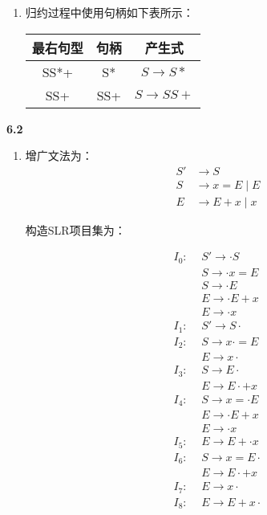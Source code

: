 \documentclass[UTF8]{report}
\newcommand{\tbf}[1]{\textbf{#1}}
\begin{document}
\begin{enumerate}[label=(\arabic*)]
\begin{table}[H]
    \end{table}
    \item 归约过程中使用句柄如下表所示：
    \begin{table}[H]
        \centering
        \begin{tabular}{|c|c|c|}
            \hline
            最右句型 & 句柄 & 产生式 \\
            \hline
            SS*+ & S* & $S \to S*$ \\
            SS+ & SS+ & $S \to SS+$ \\
            \hline
        \end{tabular}
    \end{table}
\end{enumerate}

\noindent
\tbf{6.2}

\begin{enumerate}[label=(\arabic*)]
    \item 增广文法为：
    \begin{align*}
        S' &\to S \\
        S &\to x = E \mid E \\
        E &\to E + x \mid x
    \end{align*}

    构造SLR项目集为：

    \begin{align*}
        I_0: \,\ &S' \to \cdot S \\
        &S \to \cdot x = E \\
        &S \to \cdot E \\
        &E \to \cdot E + x \\
        &E \to \cdot x \\
        I_1: \,\ &S' \to S \cdot \\
        I_2: \,\ &S \to x \cdot = E \\
        &E \to x \cdot \\
        I_3: \,\ &S \to E \cdot \\
        &E \to E \cdot + x \\
        I_4: \,\ &S \to x = \cdot E \\
        &E \to \cdot E + x \\
        &E \to \cdot x \\
        I_5: \,\ &E \to E + \cdot x \\
        I_6: \,\ &S \to x = E \cdot \\
        &E \to E \cdot + x \\
        I_7: \,\ &E \to x \cdot \\
        I_8: \,\ &E \to E + x \cdot \\
    \end{align*}


\end{enumerate}
\end{document}
